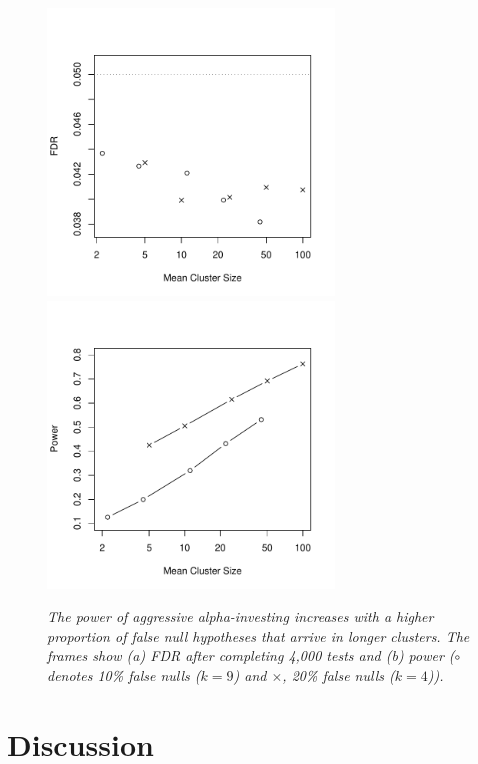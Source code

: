 \documentclass[12pt]{article}
\begin{document}
\begin{figure}
\caption{     \label{fi:stream} \sl
The power of aggressive alpha-investing increases with a higher proportion of false null hypotheses that arrive in longer clusters. The frames show (a) FDR after completing 4,000 tests and (b) power ($\circ$ denotes 10\% false nulls ($k=9$) and $\times$, 20\% false nulls  ($k=4$)).
}
\centerline{ 	
	\includegraphics[width=3in]{figure3a}  
	\includegraphics[width=3in]{figure3b}
	 }
\end{figure}



\section{Discussion}           \label{sec:discussion}
\end{document}
